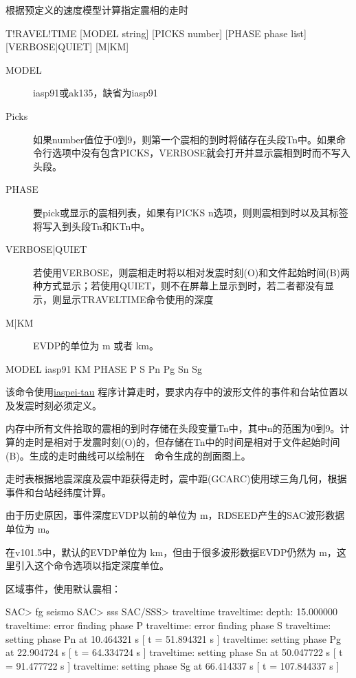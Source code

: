 \label{sss:traveltime}

根据预定义的速度模型计算指定震相的走时

\begin{SACSTX}
T!RAVEL!TIME [MODEL string] [PICKS number] [PHASE phase list]
    [VERBOSE|QUIET] [M|KM]
\end{SACSTX}

\begin{description}
\item [MODEL] iasp91或ak135，缺省为iasp91
\item [Picks] 如果number值位于0到9，则第一个震相的到时将储存在头段Tn中。如果命令行选项中没有包含PICKS，VERBOSE就会打开并显示震相到时而不写入头段。
\item [PHASE] 要pick或显示的震相列表，如果有PICKS n选项，则则震相到时以及其标签将写入到头段Tn和KTn中。
\item [VERBOSE|QUIET] 若使用VERBOSE，则震相走时将以相对发震时刻(O)和文件起始时间(B)两种方式显示；若使用QUIET，则不在屏幕上显示到时，若二者都没有显示，则显示TRAVELTIME命令使用的深度
\item [M|KM] EVDP的单位为 \si{\m} 或者 \si{\km}。
\end{description}

\begin{SACDFT}
MODEL iasp91 KM PHASE P S Pn Pg Sn Sg
\end{SACDFT}

该命令使用\href{http://www.iris.edu/software/downloads/processing/}{iaspei-tau}
程序计算走时，要求内存中的波形文件的事件和台站位置以及发震时刻必须定义。

内存中所有文件拾取的震相的到时存储在头段变量Tn中，其中n的范围为0到9。计算的走时是相对于发震时刻(O)的，但存储在Tn中的时间是相对于文件起始时间(B)。生成的走时曲线可以绘制在~~命令生成的剖面图上。

走时表根据地震深度及震中距获得走时，震中距(GCARC)使用球三角几何，根据事件和台站经纬度计算。

由于历史原因，事件深度EVDP以前的单位为 \si{\m}，RDSEED产生的SAC波形数据单位为 \si{\m}。

在v101.5中，默认的EVDP单位为 \si{\km}，但由于很多波形数据EVDP仍然为 \si{\m}，这里引入这个命令选项以指定深度单位。

区域事件，使用默认震相：
\begin{SACCode}
SAC> fg seismo
SAC> sss
SAC/SSS> traveltime
traveltime: depth: 15.000000
traveltime: error finding phase P
traveltime: error finding phase S
traveltime: setting phase Pn       at 10.464321 s [ t = 51.894321 s ]
traveltime: setting phase Pg       at 22.904724 s [ t = 64.334724 s ]
traveltime: setting phase Sn       at 50.047722 s [ t = 91.477722 s ]
traveltime: setting phase Sg      at 66.414337 s [ t = 107.844337 s ]
\end{SACCode}

